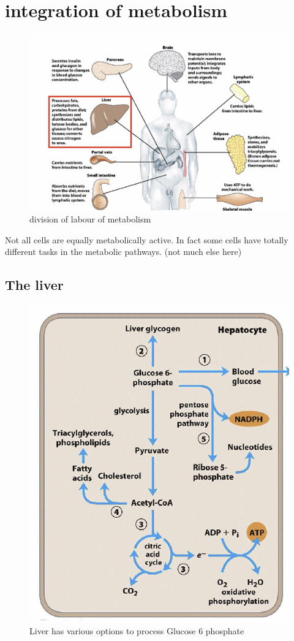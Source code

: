 \documentclass[../main.tex]{subfiles}
\begin{document}
\section{integration of metabolism}
\begin{figure}[H]
    \centering
    \includegraphics[width=\linewidth]{Sum_BC_II//lectures//bcll12/divisionLabour.png}
    \caption{division of labour of metabolism}
    \label{fig:enter-label}
\end{figure}
Not all cells are equally metabolically active. In fact some cells have totally different tasks in the metabolic pathways. 
(not much else here)

\subsection{The liver}
\begin{figure}[H]
    \centering
    \includegraphics[width=0.5\linewidth]{Sum_BC_II//lectures//bcll12/Liver.png}
    \caption{Liver has various options to process Glucose 6 phosphate}
    \label{fig:enter-label}
\end{figure}
\end{document}
